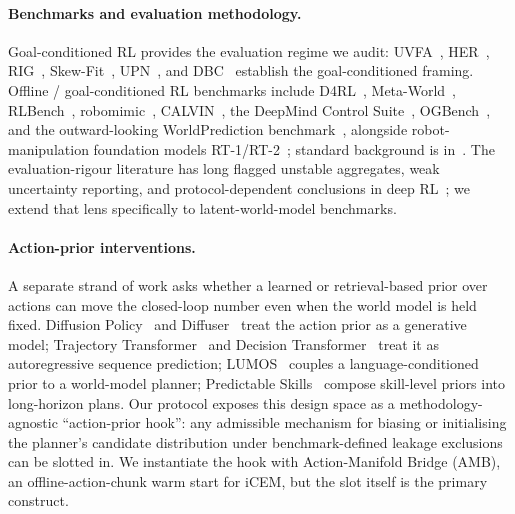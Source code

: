 \documentclass{article}
\begin{document}
\paragraph{Benchmarks and evaluation methodology.}
Goal-conditioned RL provides the evaluation regime we audit: UVFA~\cite{schaul2015uvfa}, HER~\cite{andrychowicz2017her}, RIG~\cite{nair2018rig}, Skew-Fit~\cite{pong2020skewfit}, UPN~\cite{srinivas2018upn}, and DBC~\cite{zhang2021dbc} establish the goal-conditioned framing. Offline / goal-conditioned RL benchmarks include D4RL~\cite{fu2020d4rl}, Meta-World~\cite{yu2020metaworld}, RLBench~\cite{james2020rlbench}, robomimic~\cite{mandlekar2021robomimic}, CALVIN~\cite{mees2022calvin}, the DeepMind Control Suite~\cite{tassa2018dmcontrol}, OGBench~\cite{park2025ogbench}, and the outward-looking WorldPrediction benchmark~\cite{chen2025worldprediction}, alongside robot-manipulation foundation models RT-1/RT-2~\cite{brohan2022rt1,brohan2023rt2}; standard background is in~\cite{sutton2018rlintro}. The evaluation-rigour literature has long flagged unstable aggregates, weak uncertainty reporting, and protocol-dependent conclusions in deep RL~\cite{henderson2018drltm,agarwal2021precipice}; we extend that lens specifically to latent-world-model benchmarks.

\paragraph{Action-prior interventions.}
A separate strand of work asks whether a learned or retrieval-based prior over actions can move the closed-loop number even when the world model is held fixed. Diffusion Policy~\cite{chi2025diffusionpolicy} and Diffuser~\cite{janner2022diffuser} treat the action prior as a generative model; Trajectory Transformer~\cite{janner2021trajectorytransformer} and Decision Transformer~\cite{chen2021decisiontransformer} treat it as autoregressive sequence prediction; LUMOS~\cite{nematollahi2025lumos} couples a language-conditioned prior to a world-model planner; Predictable Skills~\cite{guertler2025predictableskills} compose skill-level priors into long-horizon plans. Our protocol exposes this design space as a methodology-agnostic ``action-prior hook'': any admissible mechanism for biasing or initialising the planner's candidate distribution under benchmark-defined leakage exclusions can be slotted in. We instantiate the hook with Action-Manifold Bridge (AMB), an offline-action-chunk warm start for iCEM, but the slot itself is the primary construct.
\end{document}
